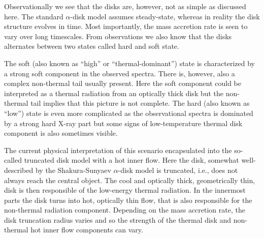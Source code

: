 %


Observationally we see that the disks are, however, not as simple as discussed here.\cite[see][,for a review]{DGK07}
The standard $\alpha$-disk model assumes steady-state, whereas in reality the disk structure evolves in time.
Most importantly, the mass accretion rate is seen to vary over long timescales.
From observations we also know that the disks alternates between two states called hard and soft state.\cite{Mitsuda89, HvdK89, GD02, MC03, MDF14, DGK07}

The soft (also known as ``high'' or ``thermal-dominant'') state is characterized by a strong soft component in the observed spectra.\cite{GZP99}
There is, however, also a complex non-thermal tail usually present.\cite{MRC00}
Here the soft component could be interpreted as a thermal radiation from an optically thick disk but the non-thermal tail implies that this picture is not complete.
The hard (also known as ``low'') state is even more complicated as the observational spectra is dominated by a strong hard X-ray part but some signs of low-temperature thermal disk component is also sometimes visible.\cite[see, e.g.,][]{ZG04}

The current physical interpretation of this scenario encapsulated into the so-called truncated disk model with a hot inner flow.
Here the disk, somewhat well-described by the Shakura-Sunyaev $\alpha$-disk model is truncated, i.e., does not always reach the central object.
The cool and optically thick, geometrically thin, disk is then responsible of the low-energy thermal radiation.
In the innermost parts the disk turns into hot, optically thin flow, that is also responsible for the non-thermal radiation component.
Depending on the mass accretion rate, the disk truncation radius varies and so the strength of the thermal disk and non-thermal hot inner flow components can vary.




